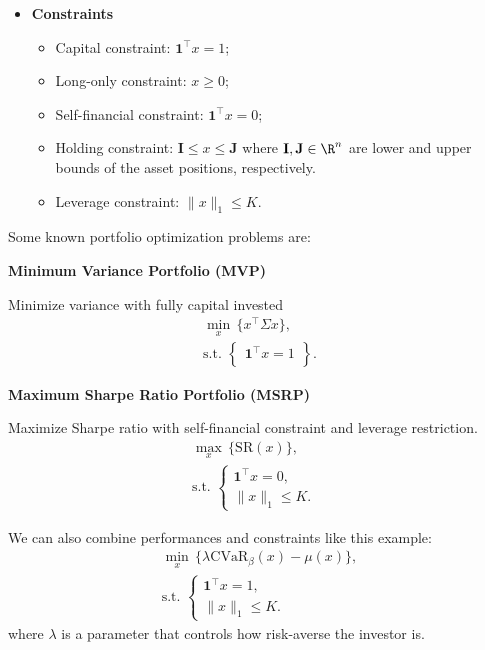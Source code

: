 \begin{itemize}
	\item \textbf{Constraints}
	      \begin{itemize}
		      \item Capital constraint: $\textbf{1}^\top x=1$;
		      \item Long-only constraint: $x\geq0$;
		      \item Self-financial constraint: $\textbf{1}^\top x=0$;
		      \item Holding constraint: $\mathbf{I}\leq x\leq \mathbf{J}$ where $\mathbf{I},\mathbf{J}\in\R^n$ are lower and upper bounds of the asset positions, respectively.
		      \item Leverage constraint: $\|x\|_1\leq K$.
	      \end{itemize}
\end{itemize}

Some known portfolio optimization problems are:

\noindent\textbf{Minimum Variance Portfolio (MVP)}

Minimize variance with fully capital invested
\begin{eqnarray}\label{eq:MVP}
	\min_{x} \,\big\{x^\top \Sigma x\big\}, \\
	\mbox{s.t. }\left\{
	\begin{aligned}\nonumber
		\mathbf{1}^\top x=1 \\
	\end{aligned}
	\right\}.
\end{eqnarray}

\noindent\textbf{Maximum Sharpe Ratio Portfolio (MSRP)}

Maximize Sharpe ratio with self-financial constraint and leverage restriction.
\begin{eqnarray}\label{prob:MSRP}
	\max_{x} \,\big\{\mbox{SR}(x)\big\}, \\
	\mbox{s.t. }\left\{
	\begin{aligned}\nonumber
		\mathbf{1}^\top x=0, & \\
		\|x\|_1\leq K.
	\end{aligned}
	\right.
\end{eqnarray}

We can also combine performances and constraints like this example:
\begin{eqnarray}\label{prob:General}
	\min_{x} \,\big\{\lambda \mbox{CVaR}_\beta(x) - \mu(x)\big\}, \\
	\mbox{s.t. }\left\{
	\begin{aligned}\nonumber
		\mathbf{1}^\top x=1, & \\
		\|x\|_1\leq K.
	\end{aligned}
	\right.
\end{eqnarray}
where $\lambda$ is a parameter that controls how risk-averse the investor is. 

